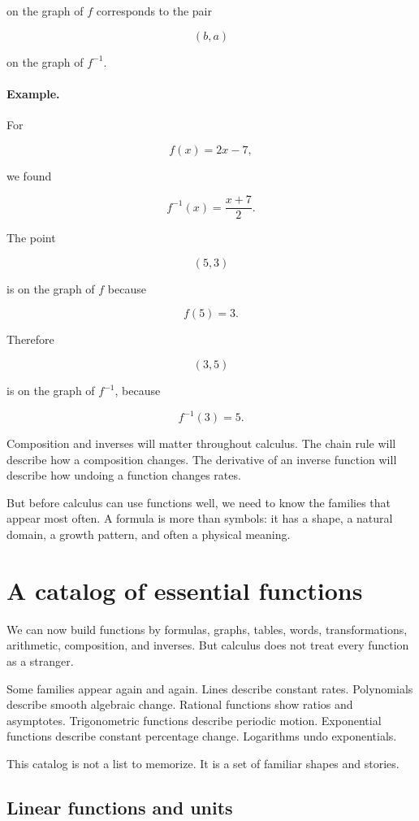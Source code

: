 on the graph of \(f\) corresponds to the pair

\[
(b,a)
\]

on the graph of \(f^{-1}\).

\paragraph{Example.}
For

\[
f(x)=2x-7,
\]

we found

\[
f^{-1}(x)=\frac{x+7}{2}.
\]

The point

\[
(5,3)
\]

is on the graph of \(f\) because

\[
f(5)=3.
\]

Therefore

\[
(3,5)
\]

is on the graph of \(f^{-1}\), because

\[
f^{-1}(3)=5.
\]

Composition and inverses will matter throughout calculus. The chain rule will describe how a composition changes. The derivative of an inverse function will describe how undoing a function changes rates.

But before calculus can use functions well, we need to know the families that appear most often. A formula is more than symbols: it has a shape, a natural domain, a growth pattern, and often a physical meaning.

\section{A catalog of essential functions}
\label{sec:catalog-essential-functions}

We can now build functions by formulas, graphs, tables, words, transformations, arithmetic, composition, and inverses. But calculus does not treat every function as a stranger.

Some families appear again and again. Lines describe constant rates. Polynomials describe smooth algebraic change. Rational functions show ratios and asymptotes. Trigonometric functions describe periodic motion. Exponential functions describe constant percentage change. Logarithms undo exponentials.

This catalog is not a list to memorize. It is a set of familiar shapes and stories.

\subsection{Linear functions and units}
\label{subsec:linear-functions-units}

